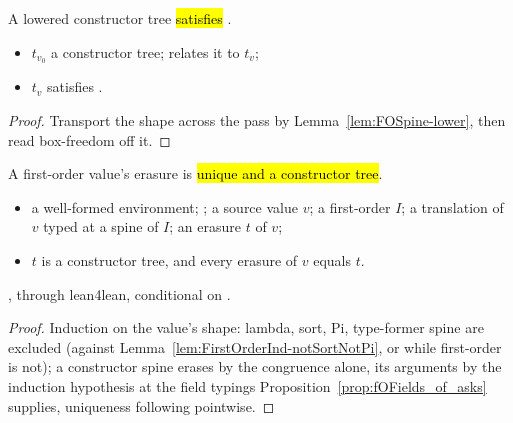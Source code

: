 \begin{lemma}
\label{lem:noBox_lower_of_foSpine}
\leanok
{}
 A lowered constructor tree \hl{satisfies }.
\begin{itemize}
\item {} $t_{v_0}$ a constructor tree; \Lower{} relates it to $t_v$;
\item {} $t_v$ satisfies .
\end{itemize}
\end{lemma}
\begin{proof}
\leanok
{}
 Transport the shape across the pass by Lemma~\ref{lem:FOSpine-lower}, then read box-freedom
off it.
\end{proof}

\begin{theorem}
\label{thm:firstorder_erases_core}
\leanok
{}
 A first-order value's erasure is \hl{unique and a constructor tree}.
\begin{itemize}
\item {} a well-formed environment; ; a source value $v$; a first-order
$I$; a translation of $v$ typed at a spine of $I$; an erasure $t$ of $v$;
\item {} $t$ is a constructor tree, and every erasure of $v$ equals $t$.
\end{itemize}
 \stProved{}, \stInherited{} through lean4lean, conditional on \stAssumed{}
.
\end{theorem}
\begin{proof}
\leanok
{}
 Induction on the value's shape: lambda, sort, Pi, type-former spine are excluded (against
Lemma~\ref{lem:FirstOrderInd-notSortNotPi}, or \Erasable{} while first-order is not); a constructor
spine erases by the congruence alone, its arguments by the induction hypothesis at the field typings
Proposition~\ref{prop:fOFields_of_asks} supplies, uniqueness following pointwise.
\end{proof}

